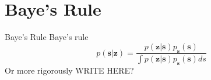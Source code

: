 \documentclass{beamer}
\begin{document}
%
%
%

\section{Baye's Rule}

\begin{frame}{Baye's Rule}
  Baye's rule
  \[
  p(\mathbf{s}|\mathbf{z}) =
  \frac{p(\mathbf{z}|\mathbf{s})p_{\mathbf{s}}(\mathbf{s})}{\int p(\mathbf{z}|\mathbf{s})p_{\mathbf{s}}(\mathbf{s})ds}
  \]
  Or more rigorously WRITE HERE?
\end{frame}
\end{document}
